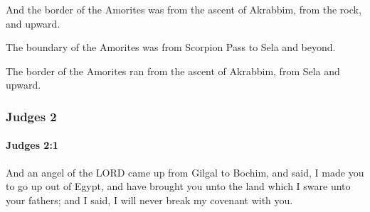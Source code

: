 			\begin{versebox}
					\item[BHS] 
					\item[ASV] And the border of the Amorites was from the ascent of Akrabbim, from the rock, and upward.
					\item[NIV] The boundary of the Amorites was from Scorpion Pass to Sela and beyond.
					\item[NRSV] The border of the Amorites ran from the ascent of Akrabbim, from Sela and upward.
			\end{versebox}
	\subsubsection{Judges 2} %
		\label{JUDGES-2}

		\paragraph{Judges 2:1} %
			\label{JUDGES-2-1}

			And an angel of the LORD came up from Gilgal to Bochim, and said, I made you to go up out of Egypt, and have brought you unto the land which I sware unto your fathers; and I said, I will never break my covenant with you.

